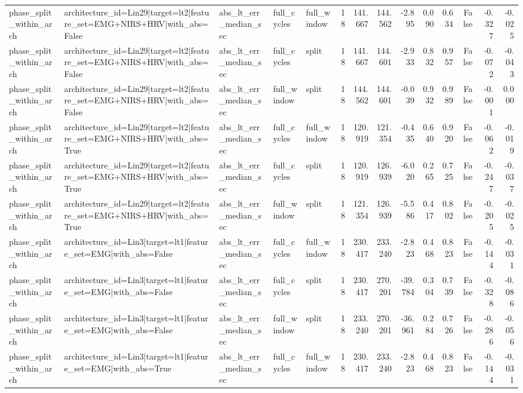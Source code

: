 \begin{table}
\begin{tabular}{lllllrrrrrrrrr}
phase_split_within_arch & architecture_id=Lin29|target=lt2|feature_set=EMG+NIRS+HRV|with_abs=False & abs_lt_err_median_sec & full_cycles & full_window & 18 & 141.667 & 144.562 & -2.895 & 0.090 & 0.634 & False & -0.327 & -0.025 \\
phase_split_within_arch & architecture_id=Lin29|target=lt2|feature_set=EMG+NIRS+HRV|with_abs=False & abs_lt_err_median_sec & full_cycles & split & 18 & 141.667 & 144.601 & -2.933 & 0.832 & 0.957 & False & -0.072 & -0.043 \\
phase_split_within_arch & architecture_id=Lin29|target=lt2|feature_set=EMG+NIRS+HRV|with_abs=False & abs_lt_err_median_sec & full_window & split & 18 & 144.562 & 144.601 & -0.039 & 0.932 & 0.989 & False & -0.001 & 0.000 \\
phase_split_within_arch & architecture_id=Lin29|target=lt2|feature_set=EMG+NIRS+HRV|with_abs=True & abs_lt_err_median_sec & full_cycles & full_window & 18 & 120.919 & 121.354 & -0.435 & 0.640 & 0.920 & False & -0.062 & -0.019 \\
phase_split_within_arch & architecture_id=Lin29|target=lt2|feature_set=EMG+NIRS+HRV|with_abs=True & abs_lt_err_median_sec & full_cycles & split & 18 & 120.919 & 126.939 & -6.020 & 0.265 & 0.725 & False & -0.247 & -0.037 \\
phase_split_within_arch & architecture_id=Lin29|target=lt2|feature_set=EMG+NIRS+HRV|with_abs=True & abs_lt_err_median_sec & full_window & split & 18 & 121.354 & 126.939 & -5.586 & 0.417 & 0.802 & False & -0.205 & -0.025 \\
phase_split_within_arch & architecture_id=Lin3|target=lt1|feature_set=EMG|with_abs=False & abs_lt_err_median_sec & full_cycles & full_window & 18 & 230.417 & 233.240 & -2.823 & 0.468 & 0.823 & False & -0.144 & -0.031 \\
phase_split_within_arch & architecture_id=Lin3|target=lt1|feature_set=EMG|with_abs=False & abs_lt_err_median_sec & full_cycles & split & 18 & 230.417 & 270.201 & -39.784 & 0.304 & 0.739 & False & -0.328 & -0.086 \\
phase_split_within_arch & architecture_id=Lin3|target=lt1|feature_set=EMG|with_abs=False & abs_lt_err_median_sec & full_window & split & 18 & 233.240 & 270.201 & -36.961 & 0.284 & 0.726 & False & -0.286 & -0.056 \\
phase_split_within_arch & architecture_id=Lin3|target=lt1|feature_set=EMG|with_abs=True & abs_lt_err_median_sec & full_cycles & full_window & 18 & 230.417 & 233.240 & -2.823 & 0.468 & 0.823 & False & -0.144 & -0.031 \\

\end{tabular}
\end{table}
